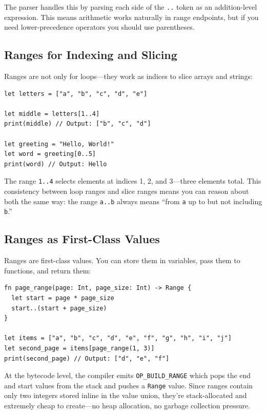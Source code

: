 The parser handles this by parsing each side of the \lstinline|..| token as an addition-level expression. This means arithmetic works naturally in range endpoints, but if you need lower-precedence operators you should use parentheses.

\subsection{Ranges for Indexing and Slicing}\label{sec:range-slicing}

Ranges are not only for loops---they work as indices to slice arrays and strings:

\begin{lstlisting}[language=Lattice, caption={Slicing with ranges}]
let letters = ["a", "b", "c", "d", "e"]

let middle = letters[1..4]
print(middle) // Output: ["b", "c", "d"]

let greeting = "Hello, World!"
let word = greeting[0..5]
print(word) // Output: Hello
\end{lstlisting}

The range \lstinline|1..4| selects elements at indices 1, 2, and 3---three elements total. This consistency between loop ranges and slice ranges means you can reason about both the same way: the range \lstinline|a..b| always means ``from \lstinline|a| up to but not including \lstinline|b|.''

\subsection{Ranges as First-Class Values}\label{sec:ranges-as-values}

Ranges are first-class values. You can store them in variables, pass them to functions, and return them:

\begin{lstlisting}[language=Lattice, caption={Ranges as first-class values}]
fn page_range(page: Int, page_size: Int) -> Range {
  let start = page * page_size
  start..(start + page_size)
}

let items = ["a", "b", "c", "d", "e", "f", "g", "h", "i", "j"]
let second_page = items[page_range(1, 3)]
print(second_page) // Output: ["d", "e", "f"]
\end{lstlisting}

At the bytecode level, the compiler emits \lstinline|OP_BUILD_RANGE| which pops the end and start values from the stack and pushes a \lstinline|Range| value. Since ranges contain only two integers stored inline in the value union, they're stack-allocated and extremely cheap to create---no heap allocation, no garbage collection pressure.


